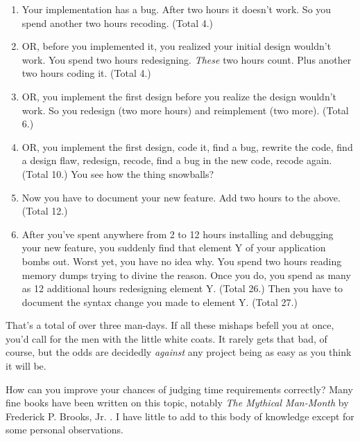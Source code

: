\begin{enumerate}
\item Your implementation has a bug. After two hours it doesn't work.
So you spend another two hours recoding. (Total 4.)
\item OR, before you implemented it, you realized your initial design
wouldn't work. You spend two hours redesigning. \emph{These} two hours
count. Plus another two hours coding it. (Total 4.)
\item OR, you implement the first design before you realize the design
wouldn't work. So you redesign (two more hours) and reimplement (two
more). (Total 6.)
\item OR, you implement the first design, code it, find a bug, rewrite
the code, find a design flaw, redesign, recode, find a bug in the new
code, recode again. (Total 10.)
You see how the thing snowballs?
\item Now you have to document your new feature. Add two hours to the
above. (Total 12.)
\item After you've spent anywhere from 2 to 12 hours installing and
debugging your new feature, you suddenly find that element Y of your
application bombs out. Worst yet, you have no idea why. You spend two
hours reading memory dumps trying to divine the reason. Once you do,
you spend as many as 12 additional hours redesigning element Y. (Total
26.) Then you have to document the syntax change you made to element
Y. (Total 27.)
\end{enumerate}

\noindent That's a total of over three man-days. If all these mishaps
befell you at once, you'd call for the men with the little white
coats. It rarely gets that bad, of course, but the odds are decidedly
\emph{against} any project being as easy as you think it will be.

How can you improve your chances of judging time requirements
correctly? Many fine books have been written on this topic, notably
\emph{The Mythical Man-Month} by Frederick P. Brooks, Jr. \cite{brooks75}.
I have little to add to this body of knowledge except for some
personal observations.

